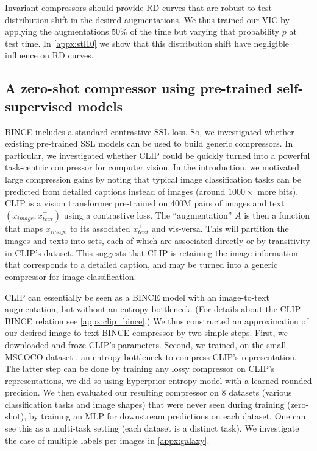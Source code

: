 \documentclass[final]{article}
\begin{document}
Invariant compressors should provide RD curves that are robust to test distribution shift in the desired augmentations.
We thus trained our VIC by applying the augmentations $50\%$ of the time but varying that probability $p$ at test time.
In \cref{appx:stl10} we show that this distribution shift have negligible influence on RD curves.





\subsection{A zero-shot compressor using pre-trained self-supervised models}
\label{sec:clip_experiments}

BINCE includes a standard contrastive SSL loss. So, we investigated whether existing pre-trained SSL models \cite{chen_simple_2020,radford_learning_2021} can be used to build generic compressors. 
In particular, we investigated whether CLIP \cite{radford_learning_2021} could be quickly turned into a powerful task-centric compressor for computer vision.
In the introduction, we motivated large compression gains by noting that typical image classification tasks can be predicted from detailed captions instead of images (around $1000\times$ more bits). 
CLIP is a vision transformer \cite{dosovitskiy_image_2020} pre-trained on 400M pairs of images and text $(x_{image}, x^+_{text})$ using a contrastive loss.
The ``augmentation'' $A$ is then a function that maps $x_{image}$ to its associated $x^+_{text}$ and vis-versa. This will partition the images and texts into sets, each of which are associated directly or by transitivity in CLIP's dataset.
This suggests that CLIP is retaining the image information that corresponds to a detailed caption, and may be turned into a generic compressor for image classification.




CLIP can essentially be seen as a BINCE model with an image-to-text augmentation, but without an entropy bottleneck.
(For details about the CLIP-BINCE relation see \cref{appx:clip_bince}.)
We thus constructed an approximation of our desired image-to-text BINCE compressor by two simple steps.
First, we downloaded and froze CLIP's parameters. Second, we trained, on the small MSCOCO dataset \cite{lin_microsoft_2015}, an entropy bottleneck to compress CLIP's representation.
The latter step can be done by training any lossy compressor on CLIP's representations, we did so using  hyperprior entropy model with a learned rounded precision.
We then evaluated our resulting compressor on 8 datasets (various classification tasks and image shapes) that were never seen during training (zero-shot), by training an MLP for downstream predictions on each dataset.
One can see this as a multi-task setting (each dataset is a distinct task). We investigate the case of multiple labels per images in \cref{appx:galaxy}.
\end{document}
